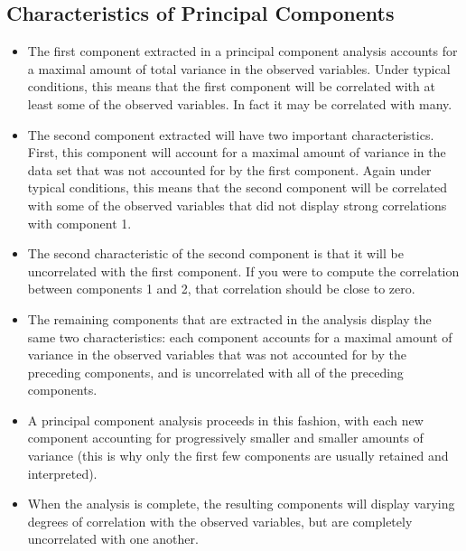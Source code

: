 \documentclass[]{article}
\begin{document}
\subsection{Characteristics of Principal Components}
\begin{itemize}
\item The first component extracted in a principal component analysis accounts for a maximal amount of total variance in the observed variables. Under typical conditions, this means that the first component will be correlated with at least
some of the observed variables.  In fact it may be correlated with many.
\item 
The second component extracted will have two important characteristics.  First,  this component
will account for a maximal amount of variance in the data set that was not accounted for by the
first component.  Again under typical conditions, this means that the second component will be
correlated with some of the observed variables that did not display strong correlations with
component 1.
\item 
The second characteristic of the second component is that it will be uncorrelated with the first
component. If you were to compute the correlation between components 1 and 2, that
correlation should be close to zero.
\item 
The remaining components that are extracted in the analysis display the same two characteristics:
each component accounts for a maximal amount of variance in the observed variables that was
not accounted for by the preceding components, and is uncorrelated with all of the preceding
components.  
\item A principal component analysis proceeds in this fashion, with each new component
accounting for progressively smaller and smaller amounts of variance (this is why only the first
few components are usually retained and interpreted).  
\item When the analysis is complete, the
resulting components will display varying degrees of correlation with the observed variables, but
are completely uncorrelated with one another.
\end{itemize}
\end{document}
